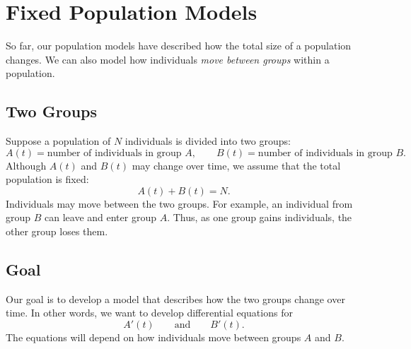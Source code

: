 \documentclass[10pt,letterpaper]{article}
\begin{document}
\section{Fixed Population Models}
So far, our population models have described how the total size of a
population changes. We can also model how individuals \textit{move between
groups} within a population.


\subsection{Two Groups}


Suppose a population of $N$ individuals is divided into two groups:
\[
A(t)=\text{number of individuals in group $A$},
\qquad
B(t)=\text{number of individuals in group $B$}.
\]
Although $A(t)$ and $B(t)$ may change over time, we assume that the total population is fixed:
\[
A(t)+B(t)=N.
\]
Individuals may move between the two groups. For example, an individual from group $B$ can leave and enter group $A$. Thus, as one group gains individuals, the other group loses them.

\subsection{Goal}

Our goal is to develop a model that describes how the two groups change over
time. In other words, we want to develop differential equations for
\[
A'(t)
\qquad\text{and}\qquad
B'(t).
\]
The equations will depend on how individuals move between groups $A$ and $B$.
\end{document}

